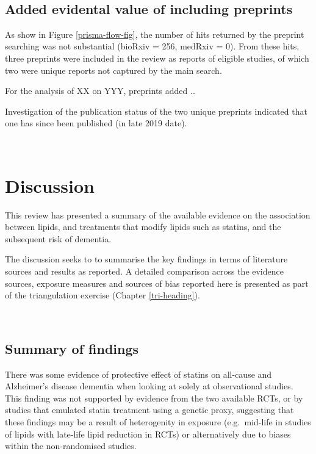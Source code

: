 \documentclass[a4paper, twoside]{templates/ociamthesis}
\begin{document}
~

\hypertarget{sys-rev-including-preprints-res}{%
\subsection{Added evidental value of including preprints}\label{sys-rev-including-preprints-res}}

As show in Figure \ref{prisma-flow-fig}, the number of hits returned by the preprint searching was not substantial (bioRxiv = 256, medRxiv = 0). From these hits, three preprints were included in the review as reports of eligible studies, of which two were unique reports not captured by the main search.

For the analysis of XX on YYY, preprints added \ldots{}

Investigation of the publication status of the two unique preprints indicated that one has since been published (in late 2019 date).

~

\hypertarget{discussion-1}{%
\section{Discussion}\label{discussion-1}}

This review has presented a summary of the available evidence on the association between lipids, and treatments that modify lipids such as statins, and the subsequent risk of dementia.

The discussion seeks to to summarise the key findings in terms of literature sources and results as reported. A detailed comparison across the evidence sources, exposure measures and sources of bias reported here is presented as part of the triangulation exercise (Chapter \ref{tri-heading}).

~

\hypertarget{summary-of-findings}{%
\subsection{Summary of findings}\label{summary-of-findings}}

There was some evidence of protective effect of statins on all-cause and Alzheimer's disease dementia when looking at solely at observational studies. This finding was not supported by evidence from the two available RCTs, or by studies that emulated statin treatment using a genetic proxy, suggesting that these findings may be a result of heterogenity in exposure (e.g.~mid-life in studies of lipids with late-life lipid reduction in RCTs) or alternatively due to biases within the non-randomised studies.
\end{document}
